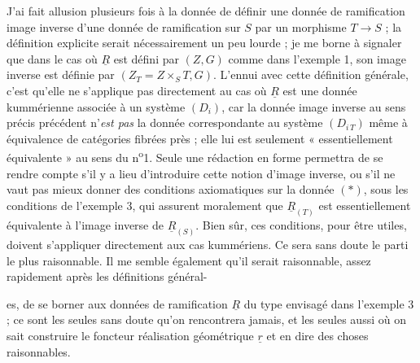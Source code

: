 \documentclass[11pt,a4paper]{article}
\begin{document}
J'ai fait allusion plusieurs fois à la donnée de définir une donnée de
ramification image inverse d'une donnée de ramification sur $S$ par un
morphisme $T \to S$ ; la définition explicite serait nécessairement un peu
lourde ; je me borne à signaler que dans le cas où $\underline{R}$ est défini
par $(Z, G)$ comme dans l'exemple 1, son image inverse est définie par
$(Z_T = Z \times_S T, G)$. L'ennui avec cette définition générale, c'est
qu'elle ne s'applique pas directement au cas où $\underline{R}$ est une donnée
kummérienne associée à un système $(D_i)$, car la donnée image inverse au sens
précis précédent n'\emph{est pas} la donnée correspondante au système
$(D_{i\,T})$ même à équivalence de catégories fibrées près ; elle lui est
seulement « essentiellement équivalente » au sens du n\textsuperscript{o}1.
Seule une rédaction en forme permettra de se rendre compte s'il y a lieu
d'introduire cette notion d'image inverse, ou s'il ne vaut pas mieux donner des
conditions axiomatiques sur la donnée $(*)$, sous les conditions de l'exemple
3, qui assurent moralement que $\underline{R}_{(T)}$ est essentiellement
équivalente à l'image inverse de $\underline{R}_{(S)}$. Bien sûr, ces
conditions, pour \struck{\ill{}} être utiles, doivent s'appliquer directement
aux cas kummériens. Ce sera sans doute le parti le plus raisonnable. Il me
semble également qu'il serait raisonnable, assez rapidement après les
définitions général-

es, de se borner aux données de ramification $\underline{R}$ du type envisagé
dans l'exemple 3 ; ce sont les seules sans doute qu'on rencontrera jamais, et
les seules aussi où on sait construire le foncteur réalisation géométrique
$\underline{r}$ et en dire des choses raisonnables.
\end{document}
